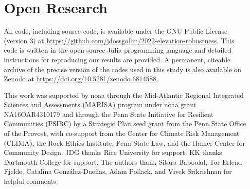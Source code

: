 \documentclass{agujournal2019}
\providecommand{\DIFadd}[1]{{\protect\color{blue}\uwave{#1}}} %
\providecommand{\DIFaddbegin}{} %
\providecommand{\DIFaddend}{} %
\newcommand{\DIFaddincludegraphics}[2][]{{\color{blue}\fbox{\DIFOincludegraphics[#1]{#2}}}} %
\DeclareRobustCommand{\DIFaddbegin}{\DIFOaddbegin \let\includegraphics\DIFaddincludegraphics} %
\DeclareRobustCommand{\DIFaddend}{\DIFOaddend \let\includegraphics\DIFOincludegraphics} %
\begin{document}
\section{Open Research}

All code, including source code, is available under the GNU Public License (version 3) at \url{https://github.com/jdossgollin/2022-elevation-robustness}.
This code is written in the open source Julia programming language and detailed instructions for reproducing our results are provided.
A permanent, citeable archive of the precise version of the codes used in this study is also available on Zenodo at \url{https://doi.org/10.5281/zenodo.6814588}.


\acknowledgments

This work was supported by \acrfull{noaa} through the Mid-Atlantic Regional Integrated Sciences and Assessments (MARISA) program under \gls{noaa} grant NA16OAR4310179 and through the Penn State Initiative for Resilient Communities (PSIRC) by a Strategic Plan seed grant from the Penn State Office of the Provost, with co-support from the Center for Climate Risk Management (CLIMA), the Rock Ethics Institute, Penn State Law, and the Hamer Center for Community Design.
JDG thanks Rice University for support.
KK thanks Dartmouth College for support.
The authors thank
Sitara Baboolal\DIFaddbegin \DIFadd{,
  Courtney Cooper}\DIFaddend ,
Tor Erlend Fjelde,
Catalina González-Dueñas,
Adam Pollack,
and
Vivek Srikrishnan
for helpful comments.





\end{document}
